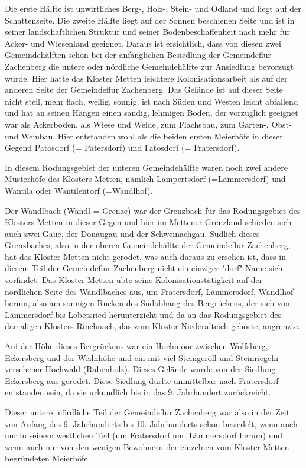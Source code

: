 Die erste Hälfte ist unwirtliches Berg-, Holz-, Stein- und Ödland und liegt auf
der Schattenseite. Die zweite Hälfte liegt auf der Sonnen beschienen Seite und
ist in seiner landschaftlichen Struktur und seiner Bodenbeschaffenheit nach mehr
für Acker- und Wiesenland geeignet. Daraus ist ersichtlich, dass von diesen zwei
Gemeindehälften schon bei der anfänglichen Besiedlung der Gemeindeflur
Zachenberg die untere oder nördliche Gemeindehälfte zur Ansiedlung bevorzugt
wurde. Hier hatte das Kloster Metten leichtere Kolonisationsarbeit als auf der
anderen Seite der Gemeindeflur Zachenberg. Das Gelände ist auf dieser Seite
nicht steil, mehr flach, wellig, sonnig, ist nach Süden und Westen leicht
abfallend und hat an seinen Hängen einen sandig, lehmigen Boden, der vorzüglich
geeignet war als Ackerboden, als Wiese und Weide, zum Flachsbau, zum Garten-,
Obst- und Weinbau. Hier entstanden wohl als die beiden ersten Meierhöfe in
dieser Gegend Patosdorf (= Patersdorf) und Fatosdorf (= Fratersdorf).

In diesem Rodungsgebiet der unteren Gemeindehälfte waren noch zwei andere
Musterhöfe des Klosters Metten, nämlich Lampertsdorf (=Lämmersdorf) und Wantila
oder Wantilentorf (=Wandlhof).

Der Wandlbach (Wandl = Grenze) war der Grenzbach für das Rodungsgebiet des
Klosters Metten in dieser Gegen und hier im Mettener Grenzland schieden sich
auch zwei Gaue, der Donaugau und der Schweinachgau. Südlich dieses Grenzbaches,
also in der oberen Gemeindehälfte der Gemeindeflur Zachenberg, hat das Kloster
Metten nicht gerodet, was auch daraus zu ersehen ist, dass in diesem Teil der
Gemeindeflur Zachenberg nicht ein einziger "dorf"-Name sich vorfindet. Das
Kloster Metten übte seine Kolonisationstätigkeit auf der nördlichen Seite des
Wandlbaches aus, um Fratersdorf, Lämmersdorf, Wandlhof herum, also am sonnigen
Rücken des Südabhang des Bergrückens, der sich von Lämmersdorf bis Lobetsried
herunterzieht und da an das Rodungsgebiet des damaligen Klosters Rinchnach, das
zum Kloster Niederalteich gehörte, angrenzte.

Auf der Höhe dieses Bergrückens war ein Hochmoor zwischen Wolfsberg, Eckersberg
und der Weilnhöhe und ein mit viel Steingeröll und Steinriegeln versehener
Hochwald (Rabenholz). Dieses Gelände wurde von der Siedlung Eckersberg aus
gerodet. Diese Siedlung dürfte unmittelbar nach Fratersdorf entstanden sein, da
sie urkundlich bis in das 9. Jahrhundert zurückreicht.

Dieser untere, nördliche Teil der Gemeindeflur Zachenberg war also in der Zeit
von Anfang des 9. Jahrhunderts bis 10. Jahrhunderts schon besiedelt, wenn auch
nur in seinem westlichen Teil (um Fratersdorf und  Lämmersdorf herum) und wenn
auch nur von den wenigen Bewohnern der einzelnen vom Kloster Metten begründeten
Meierhöfe.

